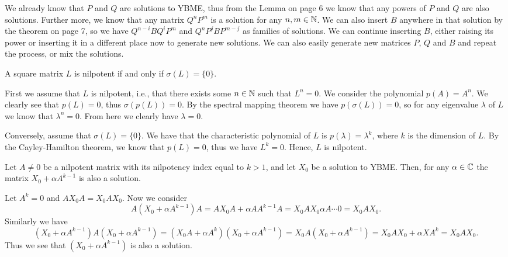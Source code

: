 \documentclass{article}
\begin{document}
\begin{solution}
  We already know that $P$ and $Q$ are solutions to YBME, thus from the Lemma on page 6 we know that any powers of $P$ and $Q$ are also solutions.
  Further more, we know that any matrix $Q^n P^m$ is a solution for any $n, m \in \mathbb{N}$.
  We can also insert $B$ anywhere in that solution by the theorem on page 7, so we have $Q^{n - i} B Q^i P^m$ and $Q^n P^j B P^{m - j}$ as families of solutions.
  We can continue inserting $B$, either raising its power or inserting it in a different place now to generate new solutions.
  We can also easily generate new matrices $P$, $Q$ and $B$ and repeat the process, or mix the solutions.
\end{solution}

\begin{problem}
  A square matrix $L$ is nilpotent if and only if $\sigma(L) = \{0\}$.
\end{problem}

\begin{solution}
  First we assume that $L$ is nilpotent, i.e., that there exists some $n \in \mathbb{N}$ such that $L^n = 0$.
  We consider the polynomial $p(A) = A^n$.
  We clearly see that $p(L) = 0$, thus $\sigma(p(L)) = 0$.
  By the spectral mapping theorem we have $p(\sigma(L)) = 0$, so for any eigenvalue $\lambda$ of $L$ we know that $\lambda^n = 0$.
  From here we clearly have $\lambda = 0$.
  
  Conversely, assume that $\sigma(L) = \{0\}$.
  We have that the characteristic polynomial of $L$ is $p(\lambda) = \lambda^k$, where $k$ is the dimension of $L$.
  By the Cayley-Hamilton theorem, we know that $p(L) = 0$, thus we have $L^k = 0$.
  Hence, $L$ is nilpotent.
\end{solution}

\begin{problem}
  Let $A \neq 0$ be a nilpotent matrix with its nilpotency index equal to $k > 1$, and let $X_0$ be a solution to YBME.
  Then, for any $\alpha \in \mathbb{C}$ the matrix $X_0 + \alpha A^{k - 1}$ is also a solution.
\end{problem}

\begin{solution}
  Let $A^k = 0$ and $A X_0 A = X_0 A X_0$.
  Now we consider
  \[A (X_0 + \alpha A^{k - 1}) A = A X_0 A + \alpha A A^{k - 1} A = X_0 A X_0 \alpha A \cdots 0 = X_0 A X_0.\]
  Similarly we have
  \[(X_0 + \alpha A^{k - 1}) A (X_0 + \alpha A^{k - 1}) = (X_0 A + \alpha A^k) (X_0 + \alpha A^{k - 1}) = X_0 A (X_0 + \alpha A^{k - 1}) = X_0 A X_0 + \alpha X A^k = X_0 A X_0.\]
  Thus we see that $(X_0 + \alpha A^{k - 1})$ is also a solution.
\end{solution}
\end{document}
